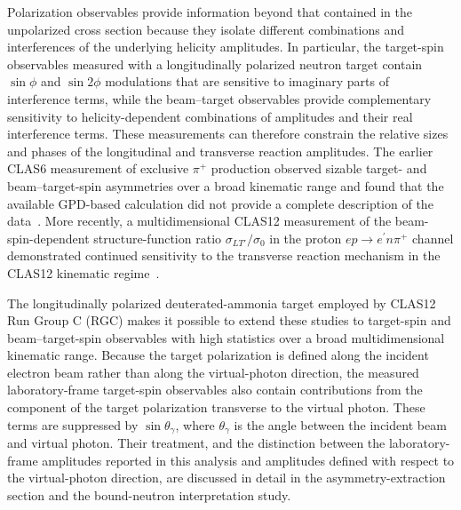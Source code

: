 Polarization observables provide information beyond that contained in the unpolarized cross section because they isolate different combinations and interferences of the underlying helicity amplitudes. In particular, the target-spin observables measured with a longitudinally polarized neutron target contain $\sin\phi$ and $\sin2\phi$ modulations that are sensitive to imaginary parts of interference terms, while the beam--target observables provide complementary sensitivity to helicity-dependent combinations of amplitudes and their real interference terms. These measurements can therefore constrain the relative sizes and phases of the longitudinal and transverse reaction amplitudes. The earlier CLAS6 measurement of exclusive $\pi^+$ production observed sizable target- and beam--target-spin asymmetries over a broad kinematic range and found that the available GPD-based calculation did not provide a complete description of the data~\cite{CLAS:2016dlz}. More recently, a multidimensional CLAS12 measurement of the beam-spin-dependent structure-function ratio $\sigma_{LT'}/\sigma_0$ in the proton $ep\rightarrow e^\prime n\pi^+$ channel demonstrated continued sensitivity to the transverse reaction mechanism in the CLAS12 kinematic regime~\cite{CLAS:2022iqy}.

The longitudinally polarized deuterated-ammonia target employed by CLAS12 Run Group C (RGC) makes it possible to extend these studies to target-spin and beam--target-spin observables with high statistics over a broad multidimensional kinematic range. Because the target polarization is defined along the incident electron beam rather than along the virtual-photon direction, the measured laboratory-frame target-spin observables also contain contributions from the component of the target polarization transverse to the virtual photon. These terms are suppressed by $\sin\theta_\gamma$, where $\theta_\gamma$ is the angle between the incident beam and virtual photon. Their treatment, and the distinction between the laboratory-frame amplitudes reported in this analysis and amplitudes defined with respect to the virtual-photon direction, are discussed in detail in the asymmetry-extraction section and the bound-neutron interpretation study.

